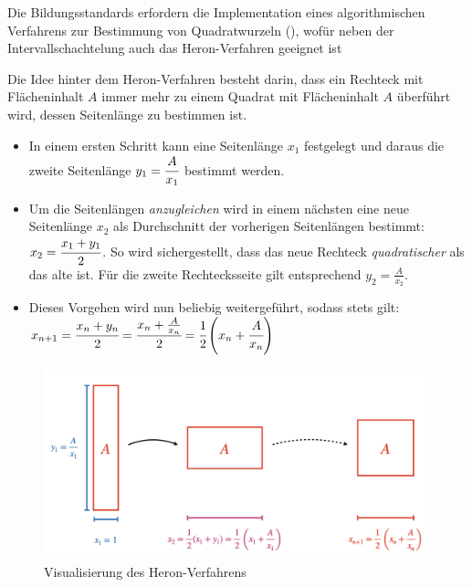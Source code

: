 \documentclass[
]{scrbook}
\providecommand{\tightlist}{%
  \setlength{\itemsep}{0pt}\setlength{\parskip}{0pt}}
\theoremstyle{definition}
\theoremstyle{definition}
\theoremstyle{definition}
\theoremstyle{definition}
\theoremstyle{remark}
\begin{document}
Die Bildungsstandards erfordern die Implementation eines algorithmischen Verfahrens zur Bestimmung von Quadratwurzeln (), wofür neben der Intervallschachtelung auch das Heron-Verfahren geeignet ist

Die Idee hinter dem Heron-Verfahren besteht darin, dass ein Rechteck mit Flächeninhalt \(A\) immer mehr zu einem Quadrat mit Flächeninhalt \(A\) überführt wird, dessen Seitenlänge zu bestimmen ist.

\begin{itemize}
\tightlist
\item
  In einem ersten Schritt kann eine Seitenlänge \(x_1\) festgelegt und daraus die zweite Seitenlänge \(y_1 = \cfrac{A}{x_1}\) bestimmt werden.\\
\item
  Um die Seitenlängen \emph{anzugleichen} wird in einem nächsten eine neue Seitenlänge \(x_2\) als Durchschnitt der vorherigen Seitenlängen bestimmt: \(x_2 = \cfrac{x_1+y_1}{2}\). So wird sichergestellt, dass das neue Rechteck \emph{quadratischer} als das alte ist. Für die zweite Rechtecksseite gilt entsprechend \(y_2 = \frac{A}{x_2}\).
\item
  Dieses Vorgehen wird nun beliebig weitergeführt, sodass stets gilt: \(x_{n+1} = \cfrac{x_n+y_n}{2} = \cfrac{x_n+\frac{A}{x_n}}{2} = \cfrac{1}{2}\left(x_n + \cfrac{A}{x_n}\right)\)
\end{itemize}

\begin{figure}

{\centering \includegraphics[width=0.9\linewidth]{pictures/9-Heron} 

}

\caption{Visualisierung des Heron-Verfahrens}\label{fig:Heron}
\end{figure}
\end{document}
